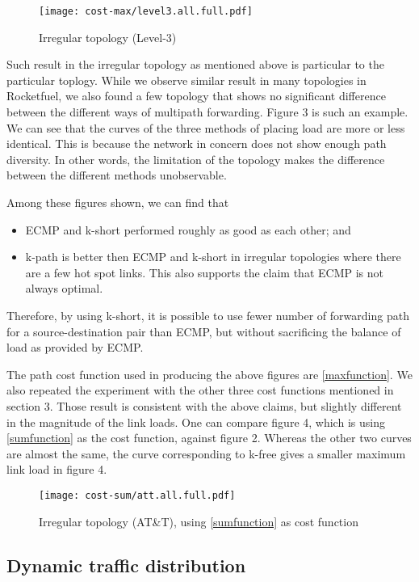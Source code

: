 \documentclass[conference]{IEEEtran}
\begin{document}
\begin{figure}
\centering\texttt{[image: cost-max/level3.all.full.pdf]}
\caption{Irregular topology (Level-3)}
\end{figure}

Such result in the irregular topology as mentioned above is particular to the
particular toplogy. While we observe similar result in many topologies in
Rocketfuel, we also found a few topology that shows no significant difference
between the different ways of multipath forwarding. Figure 3 is such an
example. We can see that the curves of the three methods of placing load are
more or less identical. This is because the network in concern does not show
enough path diversity. In other words, the limitation of the topology makes the
difference between the different methods unobservable.

Among these figures shown, we can find that
\begin{itemize}
\item ECMP and k-short performed roughly as good as each other; and
\item k-path is better then ECMP and k-short in irregular topologies where
there are a few hot spot links. This also supports the claim that ECMP is not
always optimal.
\end{itemize}
Therefore, by using k-short, it is possible to use fewer number of forwarding
path for a source-destination pair than ECMP, but without sacrificing the
balance of load as provided by ECMP.

The path cost function used in producing the above figures are
\eqref{maxfunction}. We also repeated the experiment with the other three cost
functions mentioned in section 3. Those result is consistent with the above
claims, but slightly different in the magnitude of the link loads. One can
compare figure 4, which is using \eqref{sumfunction} as the cost function,
against figure 2. Whereas the other two curves are almost the same, the curve
corresponding to k-free gives a smaller maximum link load in figure 4.

\begin{figure}
\centering\texttt{[image: cost-sum/att.all.full.pdf]}
\caption{Irregular topology (AT\&T), using \eqref{sumfunction} as cost function}
\end{figure}

\subsection{Dynamic traffic distribution}
\end{document}
